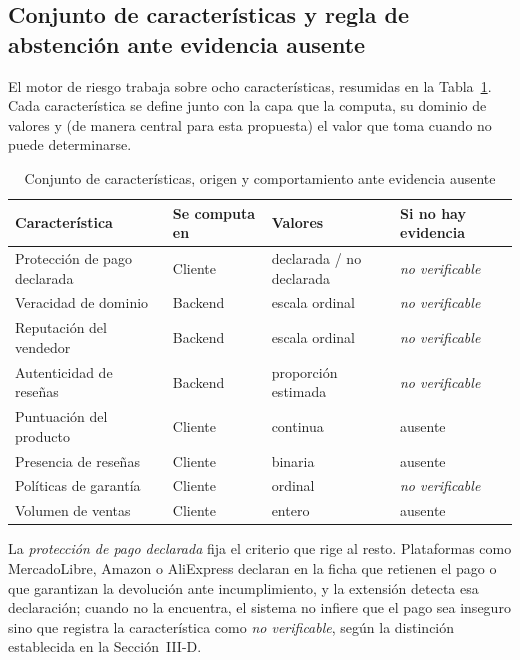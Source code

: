\subsection{Conjunto de características y regla de abstención ante evidencia ausente}

El motor de riesgo trabaja sobre ocho características, resumidas en la Tabla~\ref{tab:senales}. Cada
característica se define junto con la capa que la computa, su dominio de valores y (de manera
central para esta propuesta) el valor que toma cuando no puede determinarse.

\begin{table}[t]
\caption{Conjunto de características, origen y comportamiento ante evidencia ausente}
\label{tab:senales}
\centering
\footnotesize
\setlength{\tabcolsep}{3pt}
\renewcommand{\arraystretch}{1.15}
\begin{tabular}{@{}p{2.05cm}p{1.35cm}p{1.7cm}p{2.1cm}@{}}
\toprule
\textbf{Característica} & \textbf{Se computa en} & \textbf{Valores} & \textbf{Si no hay evidencia} \\
\midrule
Protección de pago declarada & Cliente & declarada / no declarada & \textit{no verificable} \\
Veracidad de dominio & Backend & escala ordinal & \textit{no verificable} \\
Reputación del vendedor & Backend & escala ordinal & \textit{no verificable} \\
Autenticidad de reseñas & Backend & proporción estimada & \textit{no verificable} \\
Puntuación del producto & Cliente & continua & ausente \\
Presencia de reseñas & Cliente & binaria & ausente \\
Políticas de garantía & Cliente & ordinal & \textit{no verificable} \\
Volumen de ventas & Cliente & entero & ausente \\
\bottomrule
\end{tabular}
\end{table}

La \emph{protección de pago declarada} fija el criterio que rige al resto. Plataformas como
MercadoLibre, Amazon o AliExpress declaran en la ficha que retienen el pago o que garantizan
la devolución ante incumplimiento, y la extensión detecta esa declaración; cuando no la
encuentra, el sistema no infiere que el pago sea inseguro sino que registra la característica
como \emph{no verificable}, según la distinción establecida en la Sección~III-D.

